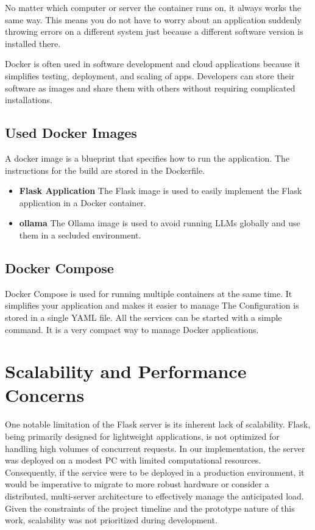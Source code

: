No matter which computer or server the container runs on, it always works the same way. This means you do not have to worry about an application suddenly throwing errors on a different system just because a different software version is installed there.

Docker is often used in software development and cloud applications because it simplifies testing, deployment, and scaling of apps. Developers can store their software as images and share them with others without requiring complicated installations.

\subsection{Used Docker Images}
A docker image is a blueprint that specifies how to run the application. The instructions for the build are stored in the Dockerfile.
\cite{dockerize_flask} 

\begin{itemize}
    \item \textbf{Flask Application} The Flask image is used to easily implement the Flask application in a Docker container.
    \item \textbf{ollama} The Ollama image is used to avoid running LLMs globally and use them in a secluded environment.
\end{itemize}

\subsection{Docker Compose}
Docker Compose is used for running multiple containers at the same time. It simplifies your application and makes it easier to manage 
The Configuration is stored in a single YAML file. All the services can be started with a simple command. It is a very compact way to manage Docker applications.
\cite{docker_compose} 

\author{Florian Prandstetter}

\section{Scalability and Performance Concerns}

One notable limitation of the Flask server is its inherent lack of scalability. Flask, being primarily designed for lightweight applications, is not optimized for handling high volumes of concurrent requests. In our implementation, the server was deployed on a modest PC with limited computational resources. Consequently, if the service were to be deployed in a production environment, it would be imperative to migrate to more robust hardware or consider a distributed, multi-server architecture to effectively manage the anticipated load. Given the constraints of the project timeline and the prototype nature of this work, scalability was not prioritized during development.


